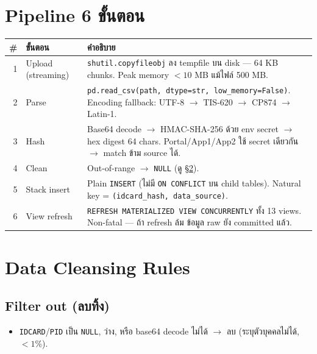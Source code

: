 \documentclass[11pt,a4paper]{article}
\begin{document}
\section{Pipeline 6 ขั้นตอน}

\begin{center}
\footnotesize
\begin{tabular}{rlL{8.5cm}}
\toprule
\# & ขั้นตอน & คำอธิบาย \\
 & Upload (streaming)  & \texttt{shutil.copyfileobj} ลง tempfile บน disk — 64 KB chunks.
  Peak memory $< 10$ MB แม้ไฟล์ 500 MB. \\
2 & Parse               & \texttt{pd.read\_csv(path, dtype=str, low\_memory=False)}.
  Encoding fallback: UTF-8 $\rightarrow$ TIS-620 $\rightarrow$ CP874 $\rightarrow$ Latin-1. \\
3 & Hash                & Base64 decode $\rightarrow$ HMAC-SHA-256 ด้วย env secret $\rightarrow$ hex digest 64 chars.
  Portal/App1/App2 ใช้ secret เดียวกัน $\rightarrow$ match ข้าม source ได้. \\
4 & Clean               & Out-of-range $\rightarrow$ \texttt{NULL} (ดู \S\ref{sec:cleanse}). \\
5 & Stack insert        & Plain \texttt{INSERT} (ไม่มี \texttt{ON CONFLICT} บน child tables).
  Natural key = \texttt{(idcard\_hash, data\_source)}. \\
6 & View refresh        & \texttt{REFRESH MATERIALIZED VIEW CONCURRENTLY} ทั้ง 13 views.
  Non-fatal — ถ้า refresh ล้ม ข้อมูล raw ยัง committed แล้ว. \\
\bottomrule
\end{tabular}
\end{center}

\section{Data Cleansing Rules}
\label{sec:cleanse}

\subsection{Filter out (ลบทิ้ง)}

\begin{itemize}[leftmargin=*, itemsep=1pt]
  \item \texttt{IDCARD}/\texttt{PID} เป็น \texttt{NULL}, ว่าง, หรือ base64 decode ไม่ได้
    $\rightarrow$ ลบ (ระบุตัวบุคคลไม่ได้, $< 1$\%).
\end{itemize}
\end{document}
